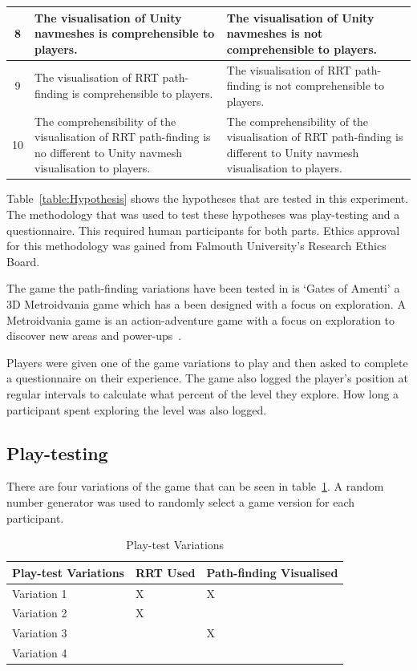 \documentclass[journal]{IEEEtran}
\begin{document}
\begin{table}[h]
\begin{tabular}{|c|p{7.5cm}|p{7.5cm}|}
			8 &   The visualisation of  Unity navmeshes is comprehensible to players.
			&  The visualisation of  Unity navmeshes is not comprehensible to players.
			\\ \hline
			
			9 &  The visualisation of  RRT path-finding is comprehensible to players.
			&  The visualisation of  RRT path-finding is not comprehensible to players.
			\\ \hline
			
			10 &  The comprehensibility of the visualisation of RRT path-finding is no different to Unity navmesh visualisation to players.
			&  The comprehensibility of the visualisation of RRT path-finding is different to Unity navmesh visualisation to players.
			\\ \hline
		\end{tabular}
	\end{table}
	Table~\ref{table:Hypothesis} shows the hypotheses that are tested in this experiment. The methodology that was used to test these hypotheses was play-testing and a questionnaire. This required human participants for both parts. Ethics approval for this methodology was gained from Falmouth University’s Research Ethics Board.
	
	The game the path-finding variations have been tested in is `Gates of Amenti' a 3D Metroidvania game which has a been designed with a focus on exploration. A Metroidvania game is an action-adventure game with a focus on exploration to discover new areas and power-ups~\cite{online:metroidvania}.
	
	Players were given one of the game variations to play and then asked to complete a questionnaire on their experience. The game also logged the player's position at regular intervals to calculate what percent of the level they explore. How long a participant spent exploring the level was also logged.
	
	\subsection{Play-testing}
	There are four variations of the game that can be seen in table~\ref{table:PlaytestVariations}.  A random number generator was used to randomly select a game version for each participant.
	
	\begin{table}[H]
		\centering
		\caption{Play-test Variations}
		\label{table:PlaytestVariations}
		\def\arraystretch{1.5}
		\begin{tabular}{ |l|l|l|}
			\hline
			\textbf{Play-test Variations} & \textbf{RRT Used}& \textbf{Path-finding Visualised} \\ \hline
			Variation 1  &  X & X \\ \hline
			Variation 2  &  X &  \\ \hline
			Variation 3  &    & X \\ \hline
			Variation 4  &    &  \\ \hline
		\end{tabular}
	\end{table}
	
\end{document}
